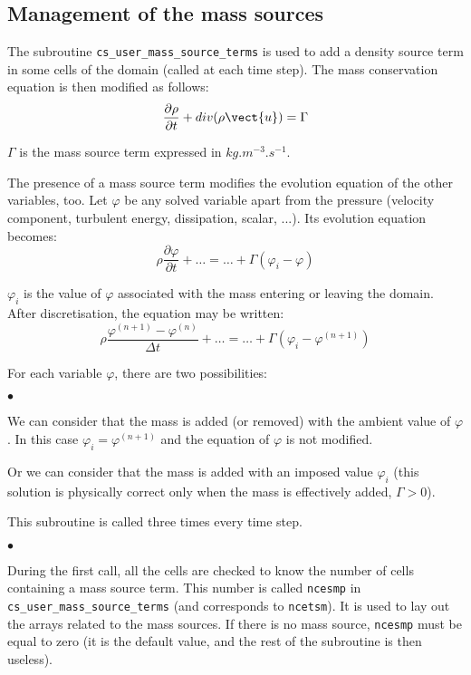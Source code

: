 {{{%
\subsection{Management of the mass sources}

The subroutine \texttt{cs\_user\_mass\_source\_terms} is used to add a density source term in some cells of
the domain (called at each time step). The mass conservation equation is then modified as follows:
\begin{displaymath}
\frac{\partial \rho}{\partial t} + div(\rho\vect{u})=\Gamma
\end{displaymath}

$\Gamma$ is the mass source term expressed in $kg.m^{-3}.s^{-1}$.

The presence of a mass source term modifies the evolution equation of
the other variables, too. Let $\varphi$ be any solved variable apart
from the pressure (velocity component, turbulent energy, dissipation,
scalar, ...). Its evolution equation becomes:
\begin{displaymath}
\rho\frac{\partial \varphi}{\partial t} + \ldots = \ldots + \Gamma(\varphi_i-\varphi)
\end{displaymath}

$\varphi_i$ is the value of $\varphi$ associated with the mass entering
or leaving the domain. After discretisation, the equation may be written:
\begin{displaymath}
\rho\frac{\varphi^{(n+1)}-\varphi^{(n)}}{\Delta t} + \ldots
= \ldots + \Gamma(\varphi_i-\varphi^{(n+1)})
\end{displaymath}

For each variable $\varphi$, there are two possibilities:
\begin{list}{$\bullet$}{}
\item We can consider that the mass is added (or removed) with the
      ambient value of $\varphi$. In this case
      $\varphi_i=\varphi^{(n+1)}$ and the equation of $\varphi$ is not
      modified.
\item Or we can consider that the mass is added with an
      imposed value $\varphi_i$ (this solution is physically correct
      only when the mass is effectively added, $\Gamma>0$).
\end{list}

\bigskip

This subroutine is called three times every time step.

\begin{list}{$\bullet$}{}
\item During the first call, all the cells are checked to know the
      number of cells containing a mass source term.
      This number is called \texttt{ncesmp} in
      \texttt{cs\_user\_mass\_source\_terms} (and corresponds to
      \texttt{ncetsm}). It is used to lay out the arrays
      related to the mass sources. If there is no mass source,
      \texttt{ncesmp} must be equal to zero (it is the default value, and the
      rest of the subroutine is then useless).


\end{list}}}}
